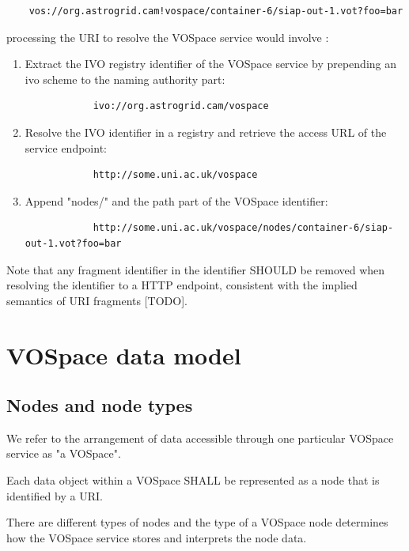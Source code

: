 \documentclass[11pt,a4paper]{ivoa}
\begin{document}
\begin{verbatim}
    vos://org.astrogrid.cam!vospace/container-6/siap-out-1.vot?foo=bar
\end{verbatim}

processing the URI to resolve the VOSpace service would involve :

\begin{enumerate}
    \item Extract the IVO registry identifier of the VOSpace service by prepending an ivo scheme to the naming authority part:
        \begin{verbatim}
            ivo://org.astrogrid.cam/vospace
        \end{verbatim}
    \item Resolve the IVO identifier in a registry and retrieve the access URL of the service endpoint:
        \begin{verbatim}
            http://some.uni.ac.uk/vospace
        \end{verbatim}
    \item Append "nodes/" and the path part of the VOSpace identifier:
        \begin{verbatim}
            http://some.uni.ac.uk/vospace/nodes/container-6/siap-out-1.vot?foo=bar
        \end{verbatim}
\end{enumerate}

Note that any fragment identifier in the identifier SHOULD be removed when resolving the identifier to a HTTP endpoint, consistent with the implied semantics of URI fragments [TODO].

\section{VOSpace data model}

\subsection{Nodes and node types}

We refer to the arrangement of data accessible through one particular VOSpace service as "a VOSpace".

Each data object within a VOSpace SHALL be represented as a node that is identified by a URI.

There are different types of nodes and the type of a VOSpace node determines how the VOSpace service stores and interprets the node data.
\end{document}
